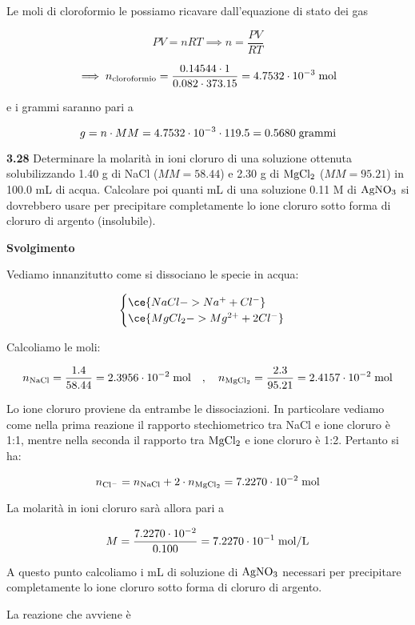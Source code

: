 Le moli di cloroformio le possiamo ricavare dall'equazione di stato dei gas

$$PV=nRT
\implies
n=\frac{PV}{RT}$$

$$\implies
n_{\rm cloroformio}=\frac{0.14544 \cdot 1}{0.082 \cdot 373.15}
=4.7532 \cdot 10^{-3} \; \rm mol$$

e i grammi saranno pari a

$$g=n \cdot MM=4.7532 \cdot 10^{-3} \cdot 119.5=0.5680 \; \rm grammi$$

\textbf{3.28} Determinare la molarità in ioni cloruro di una soluzione ottenuta solubilizzando 1.40 g di NaCl ($MM=58.44$) e 2.30 g di $\rm MgCl_2$ ($MM=95.21$) in 100.0 mL di acqua. Calcolare poi quanti mL di una soluzione 0.11 M di $\rm AgNO_3$ si dovrebbero usare per precipitare completamente lo ione cloruro sotto forma di cloruro di argento (insolubile).

\vspace{0.2cm}\large\textbf{Svolgimento}\normalsize

\vspace{0.2cm}Vediamo innanzitutto come si dissociano le specie in acqua:

$$\begin{cases}
    \ce{NaCl -> Na^+ + Cl^-}\\
    \ce{MgCl_2 -> Mg^{2+} + 2Cl^-}
\end{cases}$$

Calcoliamo le moli:

$$n_{\rm NaCl}=\frac{1.4}{58.44}=2.3956 \cdot 10^{-2} \; \text{mol}
\quad,\quad
n_{\rm MgCl_2}=\frac{2.3}{95.21}=2.4157 \cdot 10^{-2} \; \text{mol}$$

Lo ione cloruro proviene da entrambe le dissociazioni. In particolare vediamo come nella prima reazione il rapporto stechiometrico tra NaCl e ione cloruro è 1:1, mentre nella seconda il rapporto tra $\rm MgCl_2$ e ione cloruro è 1:2. Pertanto si ha:

$$n_{\rm Cl^-}
=n_{\rm NaCl} + 2 \cdot n_{\rm MgCl_2}
=7.2270 \cdot 10^{-2} \; \rm mol$$

La molarità in ioni cloruro sarà allora pari a

$$M=\frac{7.2270 \cdot 10^{-2}}{0.100}
=7.2270 \cdot 10^{-1} \; \rm mol/L$$

A questo punto calcoliamo i mL di soluzione di $\rm AgNO_3$ necessari per precipitare completamente lo ione cloruro sotto forma di cloruro di argento.

La reazione che avviene è

